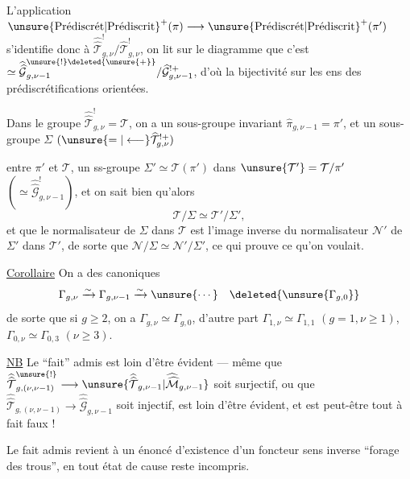 L'application $\unsure{\text{Prédiscrét}|\text{Prédiscrit}}^{+}(\pi)\longrightarrow
\unsure{\text{Prédiscrét}|\text{Prédiscrit}}^{+}(\pi')$ s'identifie donc à
$\widehat{\widehat{\mathcal T}}_{g,\nu}^{!}/\widehat{\mathcal T}_{g,\nu}^{!}$,
on lit sur le diagramme que c'est
$\simeq\widehat{\widehat{\mathcal G}}_{g,\nu-1}^{\unsure{!}\deleted{\unsure{+}}}/
\widehat{\mathcal G}_{g,\nu-1}^{!+}$,
d'où la bijectivité sur les ens des prédiscrétifications orientées.

Dans le groupe $\widehat{\widehat{\mathcal T}}_{g,\nu}^{!}=\mathcal T$,
on a un sous-groupe invariant $\widehat{\pi}_{g,\nu-1}=\pi'$,
et un sous-groupe $\Sigma$ $(\unsure{=|\longleftarrow}\widehat{\mathcal T}_{g,\nu}^{!+})$

entre $\pi'$ et $\mathcal T$,   un ss-groupe $\Sigma'\simeq\mathcal T(\pi')$ dans $\unsure{\mathcal T'}=\mathcal T/\pi'$ $(\simeq\widehat{\widehat{\mathcal G}}^{!}_{g,\nu-1})$, et on sait bien qu'alors
\[
\mathcal T/\Sigma\simeq\mathcal T'/\Sigma',
\]
et  que le normalisateur  de $\Sigma$ dans $\mathcal T$ est l'image inverse du normalisateur $\mathcal N'$ de $\Sigma'$ dans $\mathcal T'$, de sorte que $\mathcal N/\Sigma\simeq\mathcal N'/\Sigma'$, ce qui prouve ce qu'on voulait.

\uline{Corollaire} On a des  canoniques
\[
\Gamma_{g,\nu}\xrightarrow{\sim}\Gamma_{g,\nu-1}\xrightarrow{\sim}\unsure{\cdots}\quad\deleted{\unsure{\Gamma_{g,0}}}
\]
de sorte que si $g\geq2$, on a  $\Gamma_{g,\nu}\simeq\Gamma_{g,0}$, d'autre part $\Gamma_{1,\nu}\simeq\Gamma_{1,1}$ $(g=1,\nu\geq1)$, $\Gamma_{0,\nu}\simeq\Gamma_{0,3}$ $(\nu\geq3)$.

\uline{NB} Le ``fait''  admis est loin d'être évident --- même que $\widehat{\widehat{\mathcal T}}^{\unsure{!}}_{g,(\nu,\nu-1)}\longrightarrow\unsure{\widehat{\widehat{\mathcal T}}_{g,\nu-1}|\widehat{\widehat{\mathcal M}}_{g,\nu-1}}$ soit surjectif, ou que $\widehat{\widehat{\mathcal T}}_{g,(\nu,\nu-1)}\longrightarrow\widehat{\widehat{\mathcal G}}_{g,\nu-1}$ soit injectif, est loin d'être évident, et est peut-être tout à fait faux !

Le fait admis revient à un énoncé d'existence d'un foncteur  sens inverse ``forage des trous'',  en tout état de cause reste incompris.


